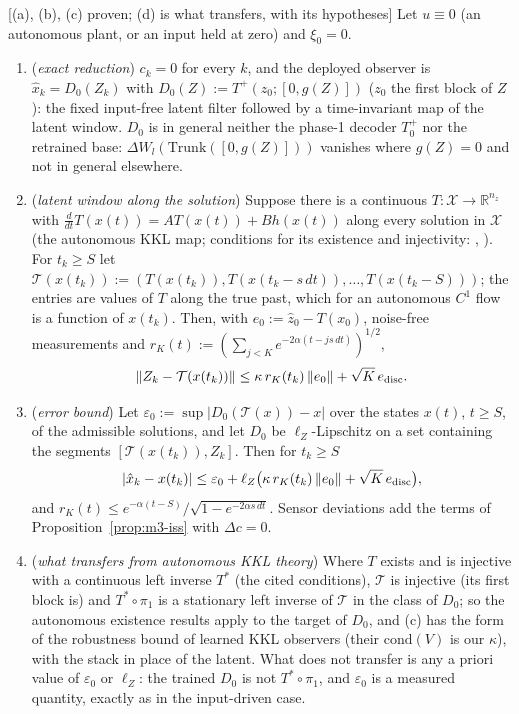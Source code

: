 \begin{proposition}\label{prop:m1-autonomous}
 [(a), (b), (c) proven; (d) is what transfers, with its hypotheses] Let $u\equiv0$ (an autonomous
plant, or an input held at zero) and $\xi_0=0$.
\begin{enumerate}[label=(\alph*)]
\item (\emph{exact reduction}) $c_k=0$ for every $k$, and the deployed observer is
$\hat x_k=D_0(Z_k)$ with $D_0(Z):=T^+(z_0;[0,g(Z)])$ ($z_0$ the first block of $Z$): the fixed input-free latent filter
followed by a time-invariant map of the latent window. $D_0$ is in general neither the phase-1 decoder $T_0^+$ nor the
retrained base: $\Delta W_l(\mathrm{Trunk}([0,g(Z)]))$ vanishes where $g(Z)=0$ and not in general elsewhere.
\item (\emph{latent window along the solution}) Suppose there is a continuous $T:\mathcal X\to\mathbb R^{n_z}$ with
$\tfrac{d}{dt}T(x(t))=AT(x(t))+Bh(x(t))$ along every solution in $\mathcal X$ (the autonomous KKL map; conditions for its
existence and injectivity: \citealp[Theorems~2.2, 2.4]{andrieu2006existence}, \citealp[Theorem~3.4]{brivadis2023further}).
For $t_k\ge S$ let $\mathcal T(x(t_k)):=(T(x(t_k)),T(x(t_k-s\,dt)),\dots,T(x(t_k-S)))$; the entries are values of
$T$ along the true past, which for an autonomous $C^1$ flow is a function of $x(t_k)$. Then, with
$e_0:=\hat z_0-T(x_0)$, noise-free measurements and $r_K(t):=(\sum_{j<K}e^{-2\alpha(t-js\,dt)})^{1/2}$,
\[
\|Z_k-\mathcal T(x(t_k))\|\le\kappa\,r_K(t_k)\,\|e_0\|+\sqrt K\,e_{\rm disc}.
\]
\item (\emph{error bound}) Let $\varepsilon_0:=\sup|D_0(\mathcal T(x))-x|$ over the states $x(t)$, $t\ge S$, of the
admissible solutions, and let $D_0$ be $\ell_Z$-Lipschitz on a set containing the segments
$[\mathcal T(x(t_k)),Z_k]$. Then for $t_k\ge S$
\[
|\hat x_k-x(t_k)|\le\varepsilon_0+\ell_Z\big(\kappa\,r_K(t_k)\,\|e_0\|+\sqrt K\,e_{\rm disc}\big),
\]
and $r_K(t)\le e^{-\alpha(t-S)}/\sqrt{1-e^{-2\alpha s\,dt}}$. Sensor deviations add the terms of
Proposition~\ref{prop:m3-iss} with $\Delta c=0$.
\item (\emph{what transfers from autonomous KKL theory}) Where $T$ exists and is injective with a continuous left
inverse $T^*$ (the cited conditions), $\mathcal T$ is injective (its first block is) and $T^*\circ\pi_1$ is a stationary
left inverse of $\mathcal T$ in the class of $D_0$; so the autonomous existence results apply to the target of $D_0$,
and (c) has the form of the robustness bound of learned KKL observers \citep[Lemma~17 and Theorem~19 of arXiv v2;
Lemma~6 and Theorem~4 of v3]{niazi2025kkl} (their $\mathrm{cond}(V)$ is our $\kappa$), with the stack in place of the latent. What does
not transfer is any a priori value of $\varepsilon_0$ or $\ell_Z$: the trained $D_0$ is not $T^*\circ\pi_1$, and
$\varepsilon_0$ is a measured quantity, exactly as in the input-driven case.
\end{enumerate}
\end{proposition}
